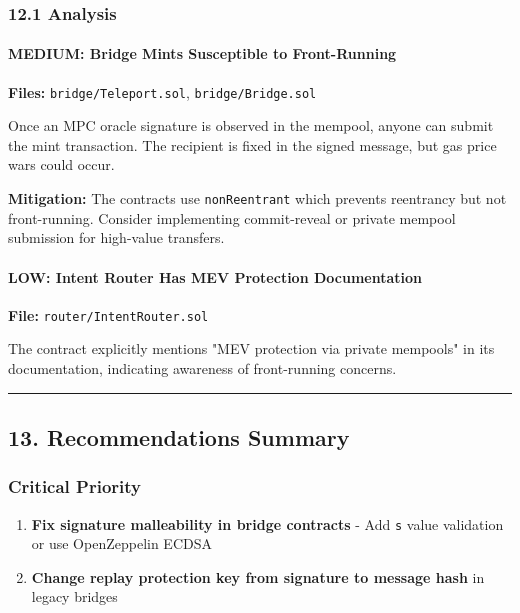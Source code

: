\documentclass[
]{article}
\providecommand{\tightlist}{%
  \setlength{\itemsep}{0pt}\setlength{\parskip}{0pt}}
\begin{document}
\subsubsection{12.1 Analysis}\label{121-analysis}

\paragraph{MEDIUM: Bridge Mints Susceptible to
Front-Running}\label{medium-bridge-mints-susceptible-to-front-running}

\textbf{Files:} \texttt{bridge/Teleport.sol}, \texttt{bridge/Bridge.sol}

Once an MPC oracle signature is observed in the mempool, anyone can
submit the mint transaction. The recipient is fixed in the signed
message, but gas price wars could occur.

\textbf{Mitigation:} The contracts use \texttt{nonReentrant} which
prevents reentrancy but not front-running. Consider implementing
commit-reveal or private mempool submission for high-value transfers.

\paragraph{LOW: Intent Router Has MEV Protection
Documentation}\label{low-intent-router-has-mev-protection-documentation}

\textbf{File:} \texttt{router/IntentRouter.sol}

The contract explicitly mentions "MEV protection via private mempools"
in its documentation, indicating awareness of front-running concerns.

\begin{center}\rule{0.5\linewidth}{0.5pt}\end{center}

\subsection{13. Recommendations
Summary}\label{13-recommendations-summary}

\subsubsection{Critical Priority}\label{critical-priority}

\begin{enumerate}
\def\labelenumi{\arabic{enumi}.}
\tightlist
\item
  \textbf{Fix signature malleability in bridge contracts} - Add
  \texttt{s} value validation or use OpenZeppelin ECDSA
\item
  \textbf{Change replay protection key from signature to message hash}
  in legacy bridges
\end{enumerate}
\end{document}
